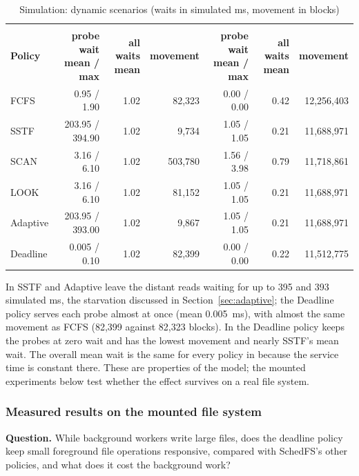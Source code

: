\documentclass[12pt,a4paper]{article}
\DeclareRobustCommand{\code}[1]{\texttt{\detokenize{#1}}}
\begin{document}
\begin{table}[!htbp]
\centering
\caption{Simulation: dynamic scenarios (waits in simulated ms, movement in blocks)}
\label{tab:simdyn}
\small
\setlength{\tabcolsep}{4pt}
\begin{tabular}{@{}l r r r r r r@{}}
\toprule
 & \multicolumn{3}{c}{\textbf{\code{stream_far}}} & \multicolumn{3}{c}{\textbf{\code{two_regions}}} \\
\cmidrule(lr){2-4}\cmidrule(l){5-7}
\textbf{Policy} & \makecell[r]{\textbf{probe wait}\\\textbf{mean / max}} & \makecell[r]{\textbf{all waits}\\\textbf{mean}} & \textbf{movement} & \makecell[r]{\textbf{probe wait}\\\textbf{mean / max}} & \makecell[r]{\textbf{all waits}\\\textbf{mean}} & \textbf{movement} \\
\midrule
FCFS & 0.95 / 1.90 & 1.02 & 82{,}323 & 0.00 / 0.00 & 0.42 & 12{,}256{,}403 \\
SSTF & 203.95 / 394.90 & 1.02 & 9{,}734 & 1.05 / 1.05 & 0.21 & 11{,}688{,}971 \\
SCAN & 3.16 / 6.10 & 1.02 & 503{,}780 & 1.56 / 3.98 & 0.79 & 11{,}718{,}861 \\
LOOK & 3.16 / 6.10 & 1.02 & 81{,}152 & 1.05 / 1.05 & 0.21 & 11{,}688{,}971 \\
Adaptive & 203.95 / 393.00 & 1.02 & 9{,}867 & 1.05 / 1.05 & 0.21 & 11{,}688{,}971 \\
Deadline & 0.005 / 0.10 & 1.02 & 82{,}399 & 0.00 / 0.00 & 0.22 & 11{,}512{,}775 \\
\bottomrule
\end{tabular}
\end{table}

\noindent In \code{stream_far} SSTF and Adaptive leave the distant reads waiting for up to 395 and 393 simulated ms, the starvation discussed in Section~\ref{sec:adaptive}; the Deadline policy serves each probe almost at once (mean 0.005~ms), with almost the same movement as FCFS (82{,}399 against 82{,}323 blocks). In \code{two_regions} the Deadline policy keeps the probes at zero wait and has the lowest movement and nearly SSTF's mean wait. The overall mean wait is the same for every policy in \code{stream_far} because the service time is constant there. These are properties of the model; the mounted experiments below test whether the effect survives on a real file system.

\subsubsection{Measured results on the mounted file system}
\label{sec:mountedres}
\textbf{Question.} While background workers write large files, does the deadline policy keep small foreground file operations responsive, compared with SchedFS's other policies, and what does it cost the background work?
\end{document}
